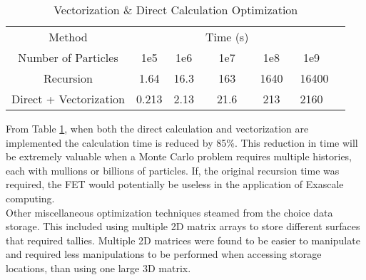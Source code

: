 \documentclass[10tma4paper]{article}
\begin{document}
\begin{table}[htbp!]
	\caption{Vectorization \& Direct Calculation Optimization}
	\centering
	\begin{tabular}{c c c c c c c }
		\hline
		Method & & & Time (s) & & & \\[0.5ex]
		Number of Particles& 1e5 & 1e6 & 1e7 & 1e8 & 1e9 &\\
		\hline		
		\hline
		Recursion & 1.64 & 16.3 & 163 & 1640 & ~16400 & \\
		Direct + Vectorization & 0.213 & 2.13 & 21.6 & 213 & 2160 & \\[1ex]
		\hline
	\end{tabular}
	\label{table:vect op}
\end{table}
From Table \ref{table:vect op}, when both the direct calculation and vectorization are implemented the calculation time is reduced by 85\%. This reduction in time will be extremely valuable when a Monte Carlo problem requires multiple histories, each with mullions or billions of particles. If, the original recursion time was required, the FET would potentially be useless in the application of Exascale computing.
\\
Other miscellaneous optimization techniques steamed from the choice data storage. This included using multiple 2D matrix arrays to store different surfaces that required tallies. Multiple 2D matrices were found to be easier to manipulate and required less manipulations to be performed when accessing storage locations, than using one large 3D matrix. 
\end{document}
